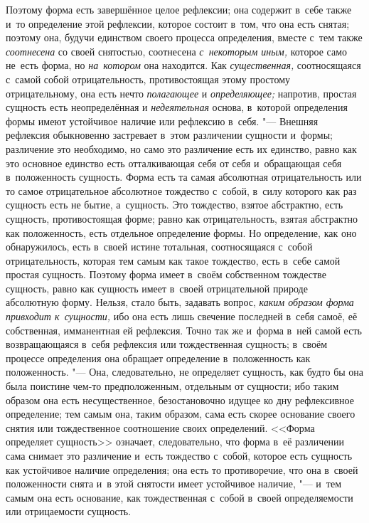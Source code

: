 Поэтому форма есть завершённое целое рефлексии; она содержит в~себе также и~то
определение этой рефлексии, которое состоит в~том, что она есть снятая; поэтому
она, будучи единством своего процесса определения, вместе с~тем также
{\em соотнесена} со своей снятостью, соотнесена {\em с~некоторым иным,}
которое само не~есть форма, но {\em на~котором} она находится. Как
{\em существенная,} соотносящаяся с~самой собой отрицательность, противостоящая
этому простому отрицательному, она есть нечто {\em полагающее} и
{\em определяющее;} напротив, простая сущность есть неопределённая и
{\em недеятельная} основа, в~которой определения формы имеют устойчивое наличие
или рефлексию в~себя. "--- Внешняя рефлексия обыкновенно застревает в~этом
различении сущности и~формы; различение это необходимо, но само это различение
есть их единство, равно как это основное единство есть отталкивающая себя от
себя и~обращающая себя в~положенность сущность. Форма есть та самая абсолютная
отрицательность или то самое отрицательное абсолютное тождество с~собой, в~силу
которого как раз сущность есть не бытие, а~сущность. Это тождество, взятое
абстрактно, есть сущность, противостоящая форме; равно как отрицательность,
взятая абстрактно как положенность, есть отдельное определение формы. Но
определение, как оно обнаружилось, есть в~своей истине тотальная, соотносящаяся
с~собой отрицательность, которая тем самым как такое тождество, есть в~себе
самой простая сущность. Поэтому форма имеет в~своём собственном тождестве
сущность, равно как сущность имеет в~своей отрицательной природе абсолютную
форму. Нельзя, стало быть, задавать вопрос,
{\em каким образом форма привходит к~сущности,} ибо она есть лишь свечение
последней в~себя самоё, её собственная, имманентная ей рефлексия. Точно так же
и~форма в~ней самой есть возвращающаяся в~себя рефлексия или тождественная
сущность; в~своём процессе определения она обращает определение в~положенность
как положенность. "--- Она, следовательно, не определяет сущность, как будто бы
она была поистине чем-то предположенным, отдельным от сущности; ибо таким
образом она есть несущественное, безостановочно идущее ко дну рефлексивное
определение; тем самым она, таким образом, сама есть скорее основание своего
снятия или тождественное соотношение своих определений. <<Форма определяет
сущность>> означает, следовательно, что форма в~её различении сама снимает это
различение и~есть тождество с~собой, которое есть сущность как устойчивое
наличие определения; она есть то противоречие, что она в~своей положенности
снята и~в этой снятости имеет устойчивое наличие, "--- и~тем самым она есть
основание, как тождественная с~собой в~своей определяемости или отрицаемости
сущность.

